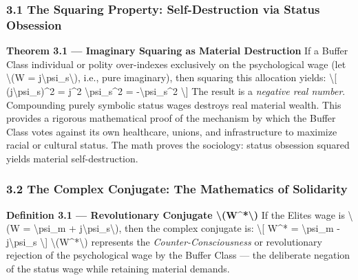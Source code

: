 {\subsubsection{3.1 The Squaring Property: Self-Destruction via Status
Obsession}\label{the-squaring-property-self-destruction-via-status-obsession}

\textbf{Theorem 3.1 --- Imaginary Squaring as Material Destruction} If a
Buffer Class individual or polity over-indexes exclusively on the
psychological wage (let \textbackslash(W =
j\textbackslash psi\_s\textbackslash), i.e., pure imaginary), then
squaring this allocation yields: \textbackslash{[}
(j\textbackslash psi\_s)\^{}2 = j\^{}2 \textbackslash psi\_s\^{}2 =
-\textbackslash psi\_s\^{}2 \textbackslash{]} The result is a
\emph{negative real number}. Compounding purely symbolic status wages
destroys real material wealth. This provides a rigorous mathematical
proof of the mechanism by which the Buffer Class votes against its own
healthcare, unions, and infrastructure to maximize racial or cultural
status. The math proves the sociology: status obsession squared yields
material self-destruction.

\subsubsection{3.2 The Complex Conjugate: The Mathematics of
Solidarity}\label{the-complex-conjugate-the-mathematics-of-solidarity}

\textbf{Definition 3.1 --- Revolutionary Conjugate
\textbackslash(W\^{}*\textbackslash)} If the Elite\textquotesingle s
wage is \textbackslash(W = \textbackslash psi\_m +
j\textbackslash psi\_s\textbackslash), then the complex conjugate is:
\textbackslash{[} W\^{}* = \textbackslash psi\_m -
j\textbackslash psi\_s \textbackslash{]}
\textbackslash(W\^{}*\textbackslash) represents the
\emph{Counter-Consciousness} or revolutionary rejection of the
psychological wage by the Buffer Class --- the deliberate negation of
the status wage while retaining material demands.

}
